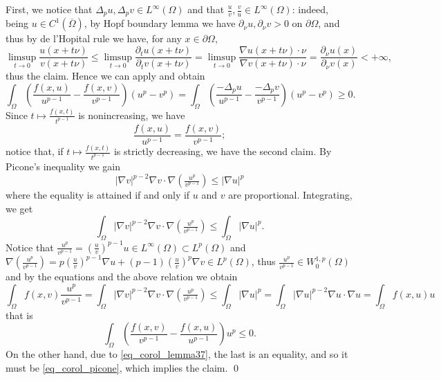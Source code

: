 \documentclass[11pt, reqno]{amsart}
\theoremstyle{definition}
\numberwithin{equation}{section}
\renewenvironment{proof}[1][\proofname]{\medskip \noindent {\bfseries #1. }}{\qed \bigskip}
\begin{document}
\begin{proof}
First, we notice that $\Delta_p u, \Delta_p v \in L^{\infty}(\Omega)$ and that $\frac{u}{v}, \frac{v}{u} \in L^{\infty}(\Omega)$: indeed, being $u \in C^1(\overline{\Omega})$, 
by Hopf boundary lemma \cite[Theorem 5]{Vaz84} 
we have $\partial_{\nu} u, \partial_{\nu} v > 0$ on $\partial \Omega$, and thus by de l'Hopital rule we have, for any $x \in \partial \Omega$, 
$$\limsup_{t \to 0} \frac{u(x+ t \nu)}{v(x + t \nu)} \leq \limsup_{t \to 0} \frac{\partial_t u(x+ t \nu)}{\partial_t v(x + t \nu)} = \limsup_{t \to 0} \frac{\nabla u(x+t\nu) \cdot \nu}{\nabla v(x+t\nu) \cdot \nu} = \frac{\partial_{\nu} u(x)}{\partial_{\nu} v(x)} < +\infty,$$
thus the claim.
Hence we can apply \cite[Lemma 2]{DiSa87} and obtain
$$\int_{\Omega} \left( \frac{f(x,u)}{u^{p-1}} - \frac{f(x,v)}{v^{p-1}}\right) (u^p - v^p) = \int_{\Omega} \left( \frac{-\Delta_p u}{u^{p-1}} - \frac{-\Delta_p v}{v^{p-1}}\right) (u^p - v^p) \geq 0.$$
Since $t \mapsto \frac{f(x, t)}{t^{p-1}}$ is nonincreasing, we have
\begin{equation}\label{eq_corol_lemma37}
\frac{f(x,u)}{u^{p-1}} = \frac{f(x,v)}{v^{p-1}};
\end{equation}
notice that, if $t \mapsto \frac{f(x, t)}{t^{p-1}}$ is strictly decreasing, we have the second claim.
By Picone's inequality \cite{AlHu98} we gain 
\begin{equation}\label{eq_corol_picone}
|\nabla v|^{p-2} \nabla v \cdot \nabla \left(\tfrac{u^p}{v^{p-1}}\right) \leq |\nabla u|^p
\end{equation}
where the equality is attained if and only if $u$ and $v$ are proportional. Integrating, we get 
$$\int_{\Omega} |\nabla v|^{p-2} \nabla v \cdot \nabla \left(\tfrac{u^p}{v^{p-1}}\right) \leq \int_{\Omega} |\nabla u|^p.$$
Notice that $\frac{u^p}{v^{p-1}} = (\frac{u}{v})^{p-1} u \in L^{\infty}(\Omega) \subset L^p(\Omega)$ and $\nabla \left(\frac{u^p}{v^{p-1}}\right) =
 p \left(\frac{u}{v}\right)^{p-1} \nabla u + (p-1)\left(\frac{u}{v}\right)^{p} \nabla v
 \in L^p(\Omega)$, 
thus $\frac{u^p}{v^{p-1}} \in W^{1,p}_0(\Omega)$ and by the equations
and the above relation we obtain
$$\int_{\Omega} f(x,v) \frac{u^p}{v^{p-1}} = \int_{\Omega} |\nabla v|^{p-2} \nabla v \cdot \nabla \left(\tfrac{u^p}{v^{p-1}}\right) \leq \int_{\Omega} |\nabla u|^p = \int_{\Omega} |\nabla u|^{p-2} \nabla u \cdot \nabla u = \int_{\Omega} f(x,u) u $$
that is
$$\int_{\Omega}\left(\frac{f(x,v)}{v^{p-1}} - \frac{f(x,u)}{u^{p-1}}\right)u^p \leq 0.$$
On the other hand, due to \eqref{eq_corol_lemma37}, the last is an equality, and so it must be \eqref{eq_corol_picone}, which implies the claim.
\end{proof}
\end{document}
